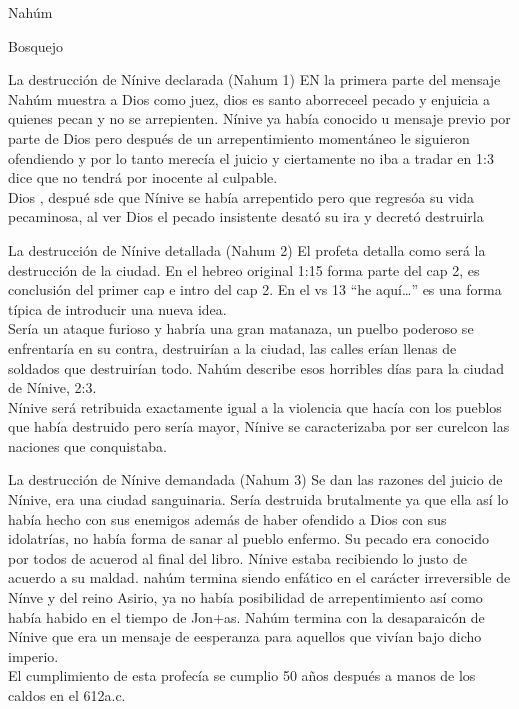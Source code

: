 \documentclass[12pt]{article}
\begin{document}
\begin{section}{Nahúm}
\begin{subsection}{Bosquejo}
\begin{subsubsection}{La destrucción de Nínive declarada (Nahum 1)}
			EN la primera parte del mensaje Nahúm muestra a Dios como juez, dios es santo aborreceel pecado y enjuicia a quienes pecan y no se arrepienten. Nínive ya había conocido u mensaje previo por parte de Dios pero después de un arrepentimiento momentáneo le siguieron ofendiendo y por lo tanto merecía el juicio y ciertamente no iba a tradar en 1:3 dice que no tendrá por inocente al culpable. \\
			Dios  , despué sde que Nínive se había arrepentido pero que regresóa  su vida pecaminosa, al ver Dios el pecado insistente desató su ira y decretó destruirla
		\end{subsubsection}
		\begin{subsubsection}{La destrucción de Nínive detallada (Nahum 2)}
			El profeta detalla como será la destrucción de la ciudad. En el hebreo original 1:15 forma parte del cap 2, es conclusión del primer cap e intro del cap 2. En el vs 13 ``he aquí\ldots'' es una forma típica de introducir una nueva idea.\\
			Sería un ataque furioso y habría una gran matanaza, un puelbo poderoso se enfrentaría en su contra, destruirían a la ciudad, las calles erían llenas de soldados que destruirían todo. Nahúm describe esos horribles días para la ciudad de Nínive, 2:3.\\
			Nínive será retribuida exactamente igual a la violencia que hacía con los pueblos que había destruido pero sería mayor, Nínive se caracterizaba por ser curelcon las naciones que conquistaba.
		\end{subsubsection}
		\begin{subsubsection}{La destrucción de Nínive demandada (Nahum 3)}
			Se dan las razones del juicio de Nínive, era una ciudad sanguinaria. Sería destruida brutalmente ya que ella así lo había hecho con sus enemigos además de haber ofendido a Dios con sus idolatrías, no había forma de sanar al pueblo enfermo. Su pecado era conocido por todos de acuerod al final del libro. Nínive estaba recibiendo lo justo de acuerdo a su maldad. nahúm termina siendo enfático en el carácter irreversible de Nínve y del reino Asirio, ya no había posibilidad de arrepentimiento así como había habido en el tiempo de Jon+as. Nahúm termina con la desaparaicón de Nínive que era un mensaje de eesperanza para aquellos que vivían bajo dicho imperio.\\
			El cumplimiento de esta profecía se cumplio 50 años después a manos de los caldos en el 612a.c.
		\end{subsubsection}
	\end{subsection}
\end{section}
\end{document}
